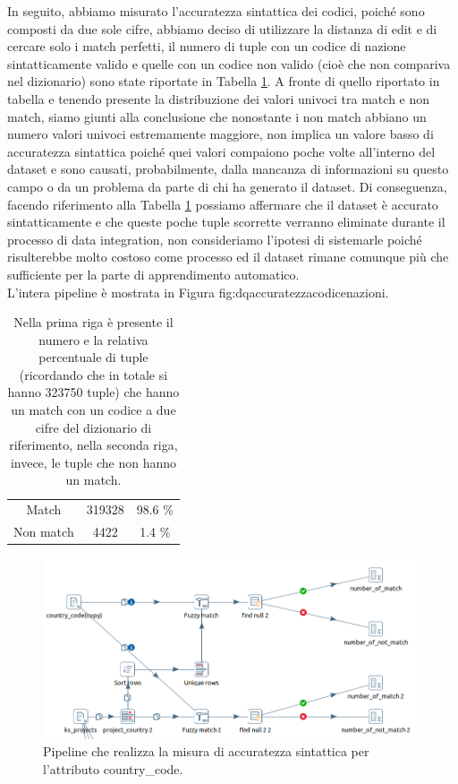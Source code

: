 In seguito, abbiamo misurato l'accuratezza sintattica dei codici, poiché sono composti da due sole cifre, abbiamo deciso di utilizzare la distanza di edit e di cercare solo i match perfetti, il numero di tuple con un codice di nazione sintatticamente valido e quelle con un codice non valido (cioè che non compariva nel dizionario) sono state riportate in Tabella \ref{tab:code_country_compl}.
A fronte di quello riportato in tabella e tenendo presente la distribuzione dei valori univoci tra match e non match, siamo giunti alla conclusione che nonostante i non match abbiano un numero valori univoci estremamente maggiore, non implica un valore basso di accuratezza sintattica poiché quei valori compaiono poche volte all'interno del dataset e sono causati, probabilmente, dalla mancanza di informazioni su questo campo o da un problema da parte di chi ha generato il dataset. 
Di conseguenza, facendo riferimento alla Tabella \ref{tab:code_country_compl} possiamo affermare che il dataset è accurato sintatticamente e che queste poche tuple scorrette verranno eliminate durante il processo di data integration, non consideriamo l'ipotesi di sistemarle poiché risulterebbe molto costoso come processo ed il dataset rimane comunque più che sufficiente per la parte di apprendimento automatico.\\
L'intera pipeline è mostrata in Figura {fig:dqaccuratezzacodicenazioni}.

\begin{table}
	\caption{Nella prima riga è presente il numero e la relativa percentuale di tuple (ricordando che in totale si hanno 323750 tuple) che hanno un match con un codice a due cifre del dizionario di riferimento, nella seconda riga, invece, le tuple che non hanno un match.}
	
	\label{tab:code_country_compl}
	
	\centering
	\begin{tabular}{c|cc}
		Match & 319328 & 98.6 \% \\ 
		Non match & 4422 & 1.4 \% \\
	\end{tabular}
\end{table} 

\begin{figure}
	\centering
	\includegraphics[width=0.7\linewidth]{images/DQ_accuratezzacodicenazioni}
	\caption{Pipeline che realizza la misura di accuratezza sintattica per l'attributo country\_code.}
	\label{fig:dqaccuratezzacodicenazioni}
\end{figure}



